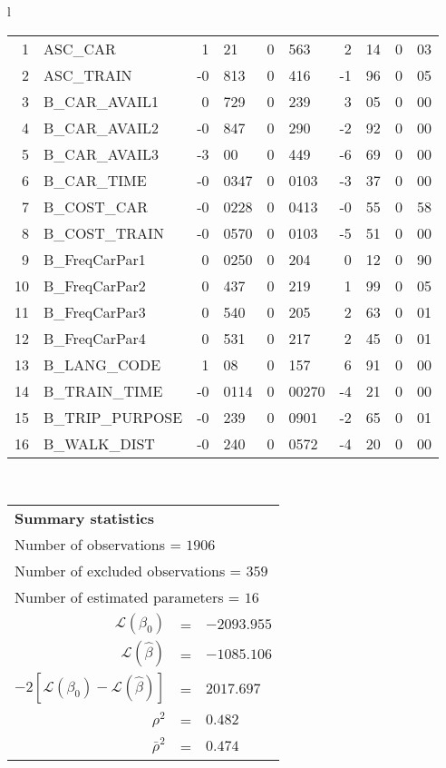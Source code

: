 \begin{tabular}{l}
\begin{tabular}{rlr@{.}lr@{.}lr@{.}lr@{.}l}
1 & ASC_CAR & 1&21 & 0&563 & 2&14 & 0&03\\
2 & ASC_TRAIN & -0&813 & 0&416 & -1&96 & 0&05\\
3 & B_CAR_AVAIL1 & 0&729 & 0&239 & 3&05 & 0&00\\
4 & B_CAR_AVAIL2 & -0&847 & 0&290 & -2&92 & 0&00\\
5 & B_CAR_AVAIL3 & -3&00 & 0&449 & -6&69 & 0&00\\
6 & B_CAR_TIME & -0&0347 & 0&0103 & -3&37 & 0&00\\
7 & B_COST_CAR & -0&0228 & 0&0413 & -0&55 & 0&58\\
8 & B_COST_TRAIN & -0&0570 & 0&0103 & -5&51 & 0&00\\
9 & B_FreqCarPar1 & 0&0250 & 0&204 & 0&12 & 0&90\\
10 & B_FreqCarPar2 & 0&437 & 0&219 & 1&99 & 0&05\\
11 & B_FreqCarPar3 & 0&540 & 0&205 & 2&63 & 0&01\\
12 & B_FreqCarPar4 & 0&531 & 0&217 & 2&45 & 0&01\\
13 & B_LANG_CODE & 1&08 & 0&157 & 6&91 & 0&00\\
14 & B_TRAIN_TIME & -0&0114 & 0&00270 & -4&21 & 0&00\\
15 & B_TRIP_PURPOSE & -0&239 & 0&0901 & -2&65 & 0&01\\
16 & B_WALK_DIST & -0&240 & 0&0572 & -4&20 & 0&00\\
\hline
\end{tabular}
\\
\begin{tabular}{rcl}
\multicolumn{3}{l}{\bf Summary statistics}\\
\multicolumn{3}{l}{ Number of observations = $1906$} \\
\multicolumn{3}{l}{ Number of excluded observations = $359$} \\
\multicolumn{3}{l}{ Number of estimated  parameters = $16$} \\
 $\mathcal{L}(\beta_0)$ &=&  $-2093.955$ \\
 $\mathcal{L}(\hat{\beta})$ &=& $-1085.106 $  \\
 $-2[\mathcal{L}(\beta_0) -\mathcal{L}(\hat{\beta})]$ &=& $2017.697$ \\
    $\rho^2$ &=&   $0.482$ \\
    $\bar{\rho}^2$ &=&    $0.474$ \\
\end{tabular}
  \end{tabular}
